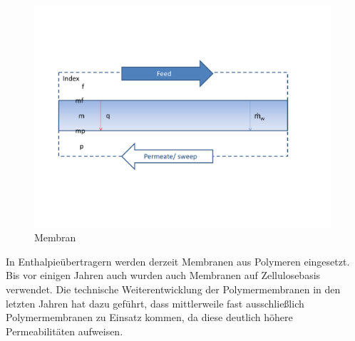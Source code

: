 \begin{normalsize}
\begin{LARGE}
\begin{figure} [h]
	\centering
	\includegraphics[width=0.98\textwidth]{pictures/Membran.pdf}
	\caption{Membran}
	\label{Membran}
\end{figure}

In Enthalpieübertragern werden derzeit Membranen aus Polymeren eingesetzt. Bis vor einigen Jahren auch wurden auch Membranen auf Zellulosebasis verwendet. Die technische Weiterentwicklung der Polymermembranen in den letzten Jahren hat dazu geführt, dass mittlerweile fast ausschließlich Polymermembranen zu Einsatz kommen, da diese deutlich höhere Permeabilitäten aufweisen. \cite{JingchunMin.}









\end{LARGE}
\end{normalsize}
